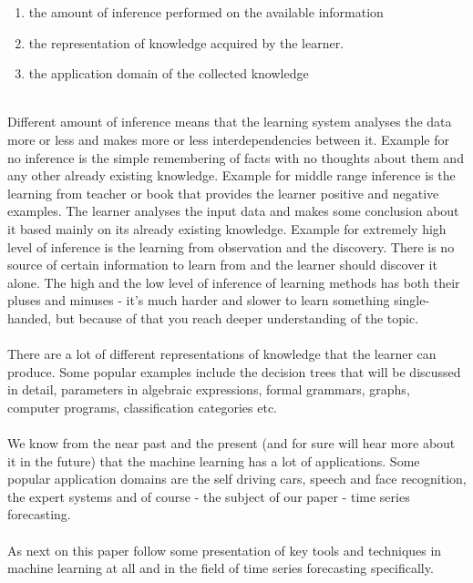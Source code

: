 \documentclass[runningheads,a4paper]{llncs}[2015/06/24]
\begin{document}
\begin{enumerate}
\item the amount of inference performed on the available information
\item the representation of knowledge acquired by the learner. 
\item the application domain of the collected knowledge 
\end{enumerate}\hspace{1cm}\\Different amount of inference means that the learning system analyses the data more or less and makes more or less interdependencies between it. Example for no inference is the simple remembering of facts with no thoughts about them and any other already existing knowledge. Example for middle range inference is the learning from teacher or book that provides the learner positive and negative examples. The learner analyses the input data and makes some conclusion about it based mainly on its already existing knowledge. Example for extremely high level of inference is the learning from observation and the discovery. There is no source of certain information to learn from and the learner should discover it alone\cite{Michalski1983}. The high and the low level of inference of learning methods has both their pluses and minuses - it's much harder and slower to learn something single-handed, but because of that you reach deeper understanding of the topic.\\\\
There are a lot of different representations of knowledge that the learner can produce. Some popular examples include the decision trees that will be discussed in detail, parameters in algebraic expressions, formal grammars, graphs, computer programs, classification categories etc.\\\\
We know from the near past and the present  (and for sure will hear more about it in the future) that the machine learning has a lot of applications. Some popular application domains are the self driving cars, speech and face recognition, the expert systems and of course - the subject of our paper - time series forecasting.  \\\\As next on this paper follow some presentation of key tools and techniques in machine learning at all and in the field of time series forecasting specifically.
				
\end{document}
